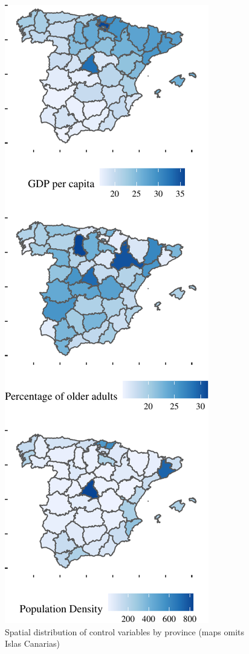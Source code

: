 \documentclass[]{elsarticle} %
\makeatletter
\def\maxwidth{\ifdim\Gin@nat@width>\linewidth\linewidth
\else\Gin@nat@width\fi}
\let\Oldincludegraphics\includegraphics
\renewcommand{\includegraphics}[1]{\Oldincludegraphics[width=\maxwidth]{#1}}
\makeatother
\begin{document}
\begin{figure}
\centering
\includegraphics{Environmental-Correlates-of-COVID19-Spain_files/figure-latex/control-map-1.pdf}
\caption{\label{fig:control-map}Spatial distribution of control
variables by province (maps omits Islas Canarias)}
\end{figure}
\end{document}

